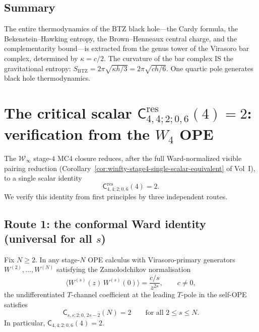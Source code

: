 \documentclass[11pt]{article}
\newcommand{\cW}{\mathcal{W}}
\begin{document}
\subsection{Summary}

The entire thermodynamics of the BTZ black hole---the Cardy
formula, the Bekenstein--Hawking entropy, the Brown--Henneaux
central charge, and the complementarity bound---is extracted
from the genus tower of the Virasoro bar complex, determined by
$\kappa = c/2$.  The curvature of the bar complex IS the
gravitational entropy:
$S_{\mathrm{BTZ}} = 2\pi\sqrt{\kappa h/3} = 2\pi\sqrt{ch/6}$.
One quartic pole generates black hole thermodynamics.


%
%

\section{The critical scalar
\texorpdfstring{$\mathsf{C}^{\mathrm{res}}_{4,4;2;0,6}(4)=2$}{C\^res\_{4,4;2;0,6}(4)=2}:
verification from the $W_4$ OPE}
\label{sec:critical-scalar-verification}

The $\cW_\infty$ stage-$4$ MC4 closure reduces, after the full Ward-normalized
visible pairing reduction (Corollary~\ref*{cor:winfty-stage4-single-scalar-equivalent}
of Vol~I), to a single scalar identity
\[
\mathsf{C}^{\mathrm{res}}_{4,4;2;0,6}(4)=2.
\]
We verify this identity from first principles by three independent routes.

\subsection{Route 1: the conformal Ward identity (universal for all $s$)}

\begin{proposition}
\label{prop:universal-T-coefficient}
Fix $N\ge 2$.  In any stage-$N$ OPE calculus with Virasoro-primary
generators $W^{(2)},\dots,W^{(N)}$ satisfying the Zamolodchikov
normalisation
\[
\langle W^{(s)}(z)\,W^{(s)}(0)\rangle = \frac{c/s}{z^{2s}},
\qquad c\neq 0,
\]
the undifferentiated $T$-channel coefficient at the leading $T$-pole
in the self-OPE satisfies
\[
\mathsf{C}_{s,s;2;0,\,2s-2}(N)=2
\qquad\text{for all } 2\le s\le N.
\]
In particular, $\mathsf{C}_{4,4;2;0,6}(4)=2$.
\end{proposition}
\end{document}
